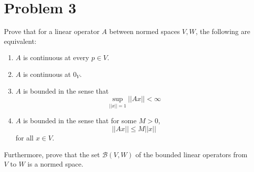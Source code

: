 \documentclass[fontsize=11pt]{scrartcl} %
\numberwithin{equation}{section} %
\numberwithin{figure}{section} %
\numberwithin{table}{section} %
\begin{document}
\section*{Problem 3}
Prove that for a linear operator $A$ between normed spaces $V,W$, the following
are equivalent:
\begin{enumerate}
    \item $A$ is continuous at every $p\in V$.
    \item $A$ is continuous at $0_V$.
    \item $A$ is bounded in the sense that 
        \[
            \sup_{||x||=1} ||Ax|| < \infty
        \]
    \item $A$ is bounded in the sense that for some $M>0$,
        \[
            ||Ax||\leq M||x||
        \]
        for all $x\in V$.
\end{enumerate}
Furthermore, prove that the set $\mathscr{B}(V,W)$ of the bounded linear
operators from $V$ to $W$ is a normed space.
\\
\end{document}

